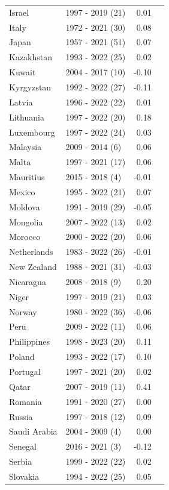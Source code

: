 \begin{table}[H]
{{\centering
\begin{tabular}{llrr}
Israel & 1997 - 2019 (21) & 0.01\\
Italy & 1972 - 2021 (30) & 0.08\\
Japan & 1957 - 2021 (51) & 0.07\\
Kazakhstan & 1993 - 2022 (25) & 0.02\\
Kuwait & 2004 - 2017 (10) & -0.10\\
\addlinespace
Kyrgyzstan & 1992 - 2022 (27) & -0.11\\
Latvia & 1996 - 2022 (22) & 0.01\\
Lithuania & 1997 - 2022 (20) & 0.18\\
Luxembourg & 1997 - 2022 (24) & 0.03\\
Malaysia & 2009 - 2014 (6) & 0.06\\
\addlinespace
Malta & 1997 - 2021 (17) & 0.06\\
Mauritius & 2015 - 2018 (4) & -0.01\\
Mexico & 1995 - 2022 (21) & 0.07\\
Moldova & 1991 - 2019 (29) & -0.05\\
Mongolia & 2007 - 2022 (13) & 0.02\\
\addlinespace
Morocco & 2000 - 2022 (20) & 0.06\\
Netherlands & 1983 - 2022 (26) & -0.01\\
New Zealand & 1988 - 2021 (31) & -0.03\\
Nicaragua & 2008 - 2018 (9) & 0.20\\
Niger & 1997 - 2019 (21) & 0.03\\
\addlinespace
Norway & 1980 - 2022 (36) & -0.06\\
Peru & 2009 - 2022 (11) & 0.06\\
Philippines & 1998 - 2023 (20) & 0.11\\
Poland & 1993 - 2022 (17) & 0.10\\
Portugal & 1997 - 2021 (20) & 0.02\\
\addlinespace
Qatar & 2007 - 2019 (11) & 0.41\\
Romania & 1991 - 2020 (27) & 0.00\\
Russia & 1997 - 2018 (12) & 0.09\\
Saudi Arabia & 2004 - 2009 (4) & 0.00\\
Senegal & 2016 - 2021 (3) & -0.12\\
\addlinespace
Serbia & 1999 - 2022 (22) & 0.02\\
Slovakia & 1994 - 2022 (25) & 0.05\\

\end{tabular}}}
\end{table}
